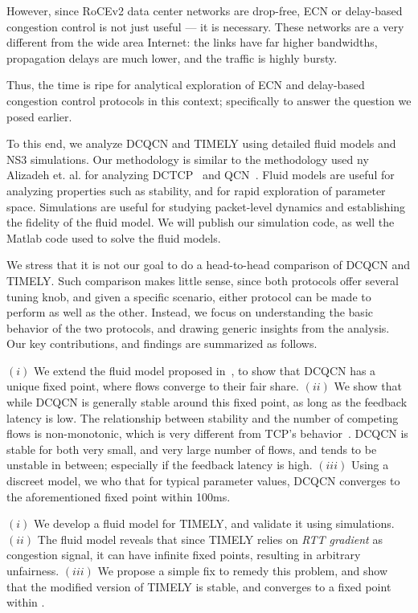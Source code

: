 However, since RoCEv2 data center networks are drop-free, ECN or
delay-based congestion control is not just useful --- it is necessary. These
networks are a very different from the wide area Internet: the links have far
higher bandwidths, propagation delays are much lower, and the traffic is highly
bursty.  

Thus, the time is ripe for analytical exploration of ECN and delay-based
congestion control protocols in this context; specifically to answer the
question we posed earlier.


To this end, we analyze DCQCN and TIMELY using detailed fluid models and NS3
simulations. Our methodology is similar to the methodology used ny Alizadeh et.
al. for analyzing DCTCP~\cite{dctcp-analysis} and QCN~\cite{qcn-analysis}. Fluid
models are useful for analyzing properties such as stability, and for rapid
exploration of parameter space.  Simulations are useful for studying
packet-level dynamics and establishing the fidelity of the fluid model.  We will
publish our simulation code, as well the Matlab code used to solve the fluid
models.


We stress that it is not our goal to do a head-to-head comparison of DCQCN and
TIMELY.  Such comparison makes little sense, since both protocols offer several
tuning knob, and given a specific scenario, either protocol can be made to
perform as well as the other. Instead, we focus on understanding the basic
behavior of the two protocols, and drawing generic insights from the analysis.
Our key contributions, and findings are summarized as follows.

 $(i)$ We extend the fluid model proposed in~\cite{dcqcn}, to
show that DCQCN has a unique fixed point, where flows converge to their fair
share. $(ii)$ We show that while DCQCN is generally stable around this
fixed point, as long as the feedback latency is low. The relationship between
stability and the number of competing flows is non-monotonic, which is very
different from TCP's behavior~\cite{misra:TAC2002}. DCQCN is stable for both
very small, and very large number of flows, and tends to be unstable in between;
especially if the feedback latency is high.  $(iii)$ Using a discreet model, we
who that for typical parameter values, DCQCN converges to the aforementioned
fixed point within 100ms.

 $(i)$ We develop a fluid model for TIMELY, and validate it using
simulations. $(ii)$ The fluid model reveals that since TIMELY relies on {\em RTT
gradient} as congestion signal, it can have infinite fixed points, resulting in
arbitrary unfairness.  $(iii)$ We propose a simple fix to remedy this problem,
and show that the modified version of TIMELY is stable, and converges to a fixed
point within . 

